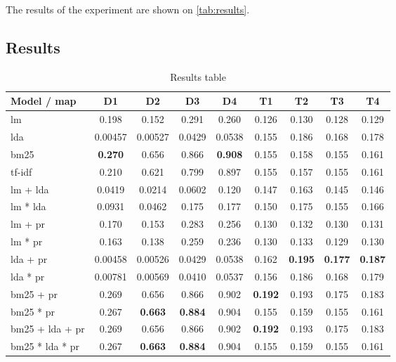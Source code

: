 The results of the experiment are shown on \autoref{tab:results}.

\subsection{Results}\label{subsec:results}

\begin{table*}[h]
	\centering
	\caption{Results table}
	\begin{tabular}{l|c|c|c|c|c|c|c|c}
		Model / \gls{map} & D1 & D2 & D3 & D4 & T1 & T2 & T3 & T4 \\
		\midrule
		\gls{lm} & 0.198 & 0.152 & 0.291 & 0.260 & 0.126 & 0.130 & 0.128 & 0.129 \\  
		\gls{lda} & 0.00457 & 0.00527 & 0.0429 & 0.0538 & 0.155 & 0.186 & 0.168 & 0.178 \\
		\gls{bm25} & \textbf{0.270} & 0.656 & 0.866 & \textbf{0.908} & 0.155 & 0.158 & 0.155 & 0.161 \\
		\gls{tf-idf} & 0.210 & 0.621 & 0.799 & 0.897 & 0.155 & 0.157 & 0.155 & 0.161 \\
		\gls{lm} + \gls{lda} & 0.0419 & 0.0214 & 0.0602 & 0.120 & 0.147 & 0.163 & 0.145 & 0.146 \\
		\gls{lm} * \gls{lda} & 0.0931 & 0.0462 & 0.175 & 0.177 & 0.150 & 0.175 & 0.155 & 0.166 \\
		\gls{lm} + \gls{pr} & 0.170 & 0.153 & 0.283 & 0.256 & 0.130 & 0.132 & 0.130 & 0.131 \\
		\gls{lm} * \gls{pr} & 0.163 & 0.138 & 0.259 & 0.236 & 0.130 & 0.133 & 0.129 & 0.130 \\
		\gls{lda} + \gls{pr} & 0.00458 & 0.00526 & 0.0429 & 0.0538 & 0.162 & \textbf{0.195} & \textbf{0.177} & \textbf{0.187} \\
		\gls{lda} * \gls{pr} & 0.00781 & 0.00569 & 0.0410 & 0.0537 & 0.156 & 0.186 & 0.168 & 0.179 \\
		\gls{bm25} + \gls{pr} & 0.269 & 0.656 & 0.866 & 0.902 & \textbf{0.192} & 0.193 & 0.175 & 0.183 \\
		\gls{bm25} * \gls{pr} & 0.267 & \textbf{0.663} & \textbf{0.884} & 0.904 & 0.155 & 0.159 & 0.155 & 0.161 \\
		\gls{bm25} + \gls{lda} + \gls{pr} & 0.269 & 0.656 & 0.866 & 0.902 & \textbf{0.192} & 0.193 & 0.175 & 0.183 \\
		\gls{bm25} * \gls{lda} * \gls{pr} & 0.267 & \textbf{0.663} & \textbf{0.884} & 0.904 & 0.155 & 0.159 & 0.155 & 0.161 \\
	\end{tabular}
	
	\label{tab:results}
\end{table*}

